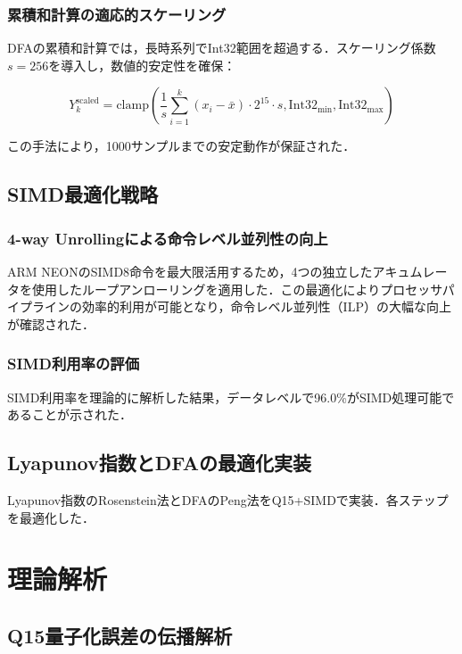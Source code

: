 \documentclass[paper]{ieicej}
\begin{document}
\subsubsection{累積和計算の適応的スケーリング}
DFAの累積和計算では，長時系列でInt32範囲を超過する．スケーリング係数$s=256$を導入し，数値的安定性を確保：

\begin{equation}
Y_k^{\text{scaled}} = \text{clamp}\left(\frac{1}{s} \sum_{i=1}^{k} (x_i - \bar{x}) \cdot 2^{15} \cdot s, \text{Int32}_{\min}, \text{Int32}_{\max}\right)
\end{equation}

この手法により，1000サンプルまでの安定動作が保証された．

\subsection{SIMD最適化戦略}

\subsubsection{4-way Unrollingによる命令レベル並列性の向上}
ARM NEONのSIMD8命令を最大限活用するため，4つの独立したアキュムレータを使用したループアンローリングを適用した．この最適化によりプロセッサパイプラインの効率的利用が可能となり，命令レベル並列性（ILP）の大幅な向上が確認された．

\subsubsection{SIMD利用率の評価}
SIMD利用率を理論的に解析した結果，データレベルで96.0\%がSIMD処理可能であることが示された．

\subsection{Lyapunov指数とDFAの最適化実装}

Lyapunov指数のRosenstein法\cite{rosenstein1993}とDFAのPeng法\cite{peng1994}をQ15+SIMDで実装．各ステップを最適化した．

\section{理論解析}

\subsection{Q15量子化誤差の伝播解析}
\end{document}
